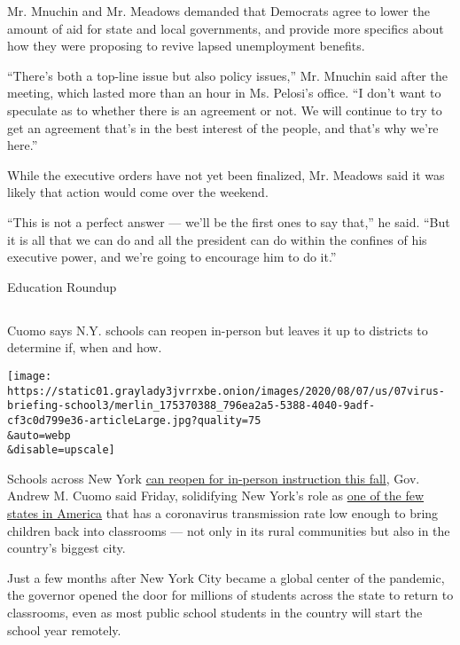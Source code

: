Mr. Mnuchin and Mr. Meadows demanded that Democrats agree to lower the
amount of aid for state and local governments, and provide more
specifics about how they were proposing to revive lapsed unemployment
benefits.

``There's both a top-line issue but also policy issues,'' Mr. Mnuchin
said after the meeting, which lasted more than an hour in Ms. Pelosi's
office. ``I don't want to speculate as to whether there is an agreement
or not. We will continue to try to get an agreement that's in the best
interest of the people, and that's why we're here.''

While the executive orders have not yet been finalized, Mr. Meadows said
it was likely that action would come over the weekend.

``This is not a perfect answer --- we'll be the first ones to say
that,'' he said. ``But it is all that we can do and all the president
can do within the confines of his executive power, and we're going to
encourage him to do it.''

Education Roundup

\hypertarget{section-1}{%
\subsection{}\label{section-1}}

Cuomo says N.Y. schools can reopen in-person but leaves it up to
districts to determine if, when and how.

\texttt{[image: https://static01.graylady3jvrrxbe.onion/images/2020/08/07/us/07virus-briefing-school3/merlin\_175370388\_796ea2a5-5388-4040-9adf-cf3c0d799e36-articleLarge.jpg?quality=75\\\&auto=webp\\\&disable=upscale]}

Schools across New York
\href{https://www.nytimes3xbfgragh.onion/2020/08/07/nyregion/cuomo-schools-reopening.html}{can
reopen for in-person instruction this fall}, Gov. Andrew M. Cuomo said
Friday, solidifying New York's role as
\href{https://www.nytimes3xbfgragh.onion/2020/08/05/nyregion/nyc-schools-reopening.html}{one
of the few states in America} that has a coronavirus transmission rate
low enough to bring children back into classrooms --- not only in its
rural communities but also in the country's biggest city.

Just a few months after New York City became a global center of the
pandemic, the governor opened the door for millions of students across
the state to return to classrooms, even as most public school students
in the country will start the school year remotely.

